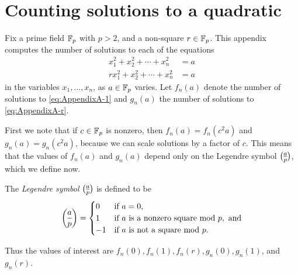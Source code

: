 \section{Counting solutions to a quadratic}\label{sec:recursion-for-quadratic-solns}
Fix a prime field $\mathbb{F}_p$ with $p>2$, and a non-square $r\in \mathbb{F}_p$.
This appendix computes the number of solutions to each of the equations
\begin{align}
	x_1^2 + x_2^2 + \cdots + x_n^2 &= a \label{eq:AppendixA-1}\\
	rx_1^2 + x_2^2 + \cdots + x_n^2 &= a \label{eq:AppendixA-r}
\end{align}
in the variables $x_1,\ldots, x_n$, as $a \in \mathbb{F}_p$ varies. Let $f_n (a)$ denote the number of solutions to \eqref{eq:AppendixA-1} and $g_n (a)$ the number of solutions to \eqref{eq:AppendixA-r}.

First we note that if $c \in \mathbb{F}_p$ is nonzero, then $f_n (a) = f_n (c^2 a)$ and $g_n (a) = g_n (c^2 a)$, because we can scale solutions by a factor of $c$. This means that the values of $f_n (a)$ and $g_n (a)$ depend only on the Legendre symbol $\legendre{a}{p}$, which we define now.
\begin{defn}
	The \emph{Legendre symbol} $\legendre{a}{p}$ is defined to be
	\[
	\legendre{a}{p} = \begin{cases}
	0 & \text{if }a = 0,\\
	1 & \text{if }a\text{ is a nonzero square mod }p, \text{ and}\\
	-1 & \text{if }a\text{ is not a square mod }p.
	\end{cases}
	\]
\end{defn}

Thus the values of interest are $f_n (0), f_n(1), f_n(r), g_n(0), g_n(1)$, and $g_n(r)$.

